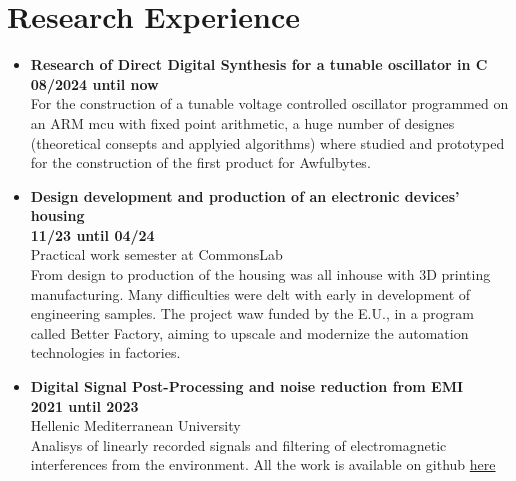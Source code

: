 \documentclass[a4paper,9pt]{extarticle}
\begin{document}
\section*{Research Experience}
\noindent
\begin{itemize}
\item{\textbf{Research of Direct Digital Synthesis for a tunable oscillator in C}}\\
        \textbf{08/2024 until now}\\
        For the construction of a tunable voltage controlled oscillator programmed on an ARM mcu
        with fixed point arithmetic, a huge number of designes (theoretical consepts and
        applyied algorithms) where studied and prototyped for the construction of the first
        product for Awfulbytes.\\
\item{\textbf{Design development and production of an electronic devices' housing}} \\
        \textbf{11/23 until 04/24} \\
        Practical work semester at CommonsLab\\
        From design to production of the housing was all inhouse with 3D printing
        manufacturing. Many difficulties were delt with early in development of
        engineering samples. The project waw funded by the E.U., in a program
        called Better Factory, aiming to upscale and modernize the automation
        technologies in factories.\\
\item{\textbf{Digital Signal Post-Processing and noise reduction from EMI}}\\
        \textbf{2021 until 2023} \\
        Hellenic Mediterranean University\\
        Analisys of linearly recorded signals and filtering of electromagnetic
        interferences from the environment. All the work is available on github \href{https://github.com/hmu-mech-npap/}{here}
\end{itemize}
\end{document}
